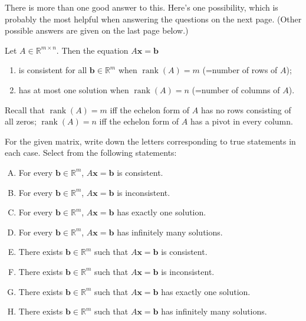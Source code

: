 \documentclass[addpoints,12pt]{exam}
\theoremstyle{remark}
\renewcommand{\vec}[1]{\mathbf{#1}}
\newcommand\rank{\ensuremath{\operatorname{rank}}}
\newcommand{\<}{\ensuremath{\langle}}
\renewcommand{\>}{\ensuremath{\rangle}}
\newcommand{\R}{\ensuremath{\mathbb{R}}}
\newcommand\vb{\vec{b}}
\newcommand\vx{\vec{x}}
\begin{document}
\begin{questions}
\begin{solution}
There is more than one good answer to this.  Here's one possibility, which is probably the most
helpful when answering the questions on the next page.  
(Other possible answers are given on the last page below.)

Let $A\in \R^{m\times n}$. Then the equation $A\vx = \vb$ 
\begin{enumerate}
\item is consistent for all $\vb \in \R^m$ when $\rank(A)=m$ (=number of rows of $A$);
\item has at most one solution when $\rank(A)=n$ (=number of columns of $A$).
\end{enumerate}
Recall that $\rank(A)=m$ iff the echelon form of $A$ has 
no rows consisting of all zeros; 
$\rank(A)=n$ iff the echelon form of $A$ has 
a pivot in every column.

\end{solution}


\newpage


\question For the given matrix, write down the letters corresponding to true statements in each case.
Select from the following statements:
\begin{enumerate}[A.]
        \item For every $\vb \in \R^m$, $A\vx = \vb$ is consistent.
        \item For every $\vb \in \R^m$, $A\vx = \vb$ is inconsistent.
        \item For every $\vb \in \R^m$, $A\vx = \vb$ has exactly one solution.
        \item For every $\vb \in \R^m$, $A\vx = \vb$ has infinitely many solutions.
        \item There exists $\vb \in \R^m$ such that $A\vx = \vb$ is consistent.
        \item There exists $\vb \in \R^m$ such that $A\vx = \vb$ is inconsistent.
        \item There exists $\vb \in \R^m$ such that $A\vx = \vb$ has exactly one solution.
        \item There exists $\vb \in \R^m$ such that $A\vx = \vb$ has infinitely many solutions.
\end{enumerate}
\begin{parts}

\end{parts}
\end{questions}
\end{document}
